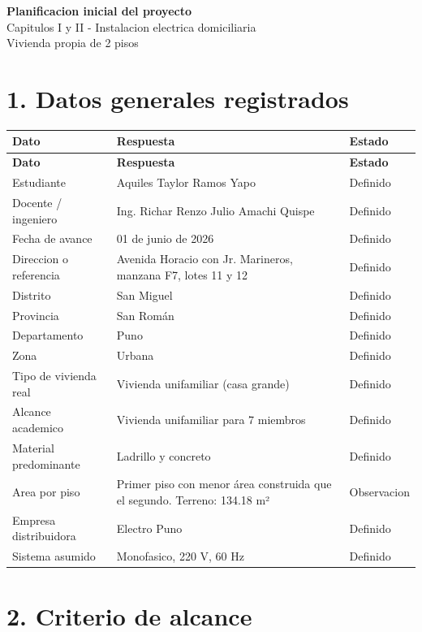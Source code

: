 \documentclass[12pt,a4paper]{article}
\newcommand{\obs}{\textcolor{orange!70!black}{Observacion}}
\newcommand{\ok}{\textcolor{green!50!black}{Definido}}
\begin{document}
\begin{center}
{\Large \textbf{Planificacion inicial del proyecto}}\\
{\large Capitulos I y II - Instalacion electrica domiciliaria}\\
{\normalsize Vivienda propia de 2 pisos}
\end{center}

\section*{1. Datos generales registrados}

\begin{longtable}{L{5.2cm}L{7.8cm}L{2.2cm}}
\toprule
\textbf{Dato} & \textbf{Respuesta} & \textbf{Estado} \\
\midrule
\endfirsthead
\toprule
\textbf{Dato} & \textbf{Respuesta} & \textbf{Estado} \\
\midrule
\endhead
Estudiante & Aquiles Taylor Ramos Yapo & \ok \\
Docente / ingeniero & Ing. Richar Renzo Julio Amachi Quispe & \ok \\
Fecha de avance & 01 de junio de 2026 & \ok \\
Direccion o referencia & Avenida Horacio con Jr. Marineros, manzana F7, lotes 11 y 12 & \ok \\
Distrito & San Miguel & \ok \\
Provincia & San Román & \ok \\
Departamento & Puno & \ok \\
Zona & Urbana & \ok \\
Tipo de vivienda real & Vivienda unifamiliar (casa grande) & \ok \\
Alcance academico & Vivienda unifamiliar para 7 miembros & \ok \\
Material predominante & Ladrillo y concreto & \ok \\
Area por piso & Primer piso con menor área construida que el segundo. Terreno: 134.18 m² & \obs \\
Empresa distribuidora & Electro Puno & \ok \\
Sistema asumido & Monofasico, 220 V, 60 Hz & \ok \\
\bottomrule
\end{longtable}

\section*{2. Criterio de alcance}
\end{document}
